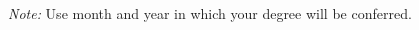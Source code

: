 %

\begin{spacing}{1.0}

\end{spacing}
\nocite{*}
%
%
%
%
%

\flushleft
\textit{Note:} Use month and year in which your degree will be conferred.
\begin{thesisshorttitlepage}
\end{thesisshorttitlepage}

